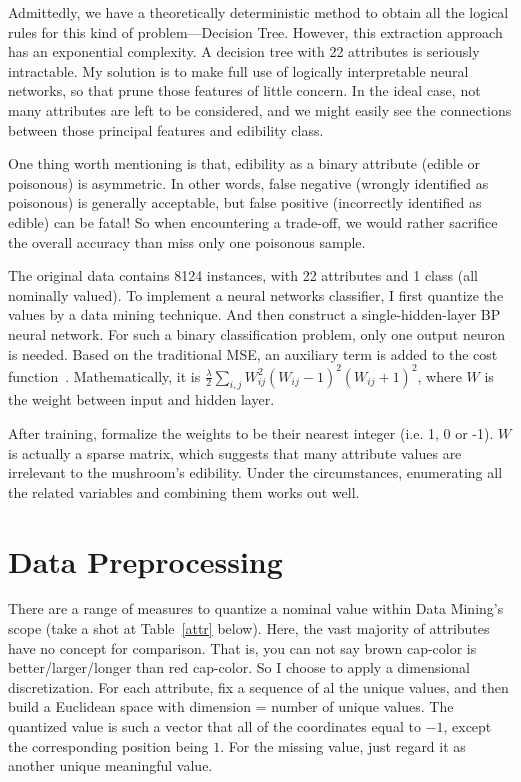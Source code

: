 \documentclass[runningheads]{llncs}
\newcommand*{\term}{\frac{\lambda}{2}\sum_{i, j}W_{ij}^2(W_{ij}-1)^2(W_{ij}+1)^2}
\begin{document}
Admittedly, we have a theoretically deterministic method to obtain all the logical rules for this kind of problem---Decision Tree. However, this extraction approach has an exponential complexity. A decision tree with 22 attributes is seriously intractable. My solution is to make full use of logically interpretable neural networks, so that prune those features of little concern. In the ideal case, not many attributes are left to be considered, and we might easily see the connections between those principal features and edibility class.

One thing worth mentioning is that, edibility as a binary attribute (edible or poisonous) is asymmetric. In other words, false negative (wrongly identified as poisonous) is generally acceptable, but false positive (incorrectly identified as edible) can be fatal! So when encountering a trade-off, we would rather sacrifice the overall accuracy than miss only one poisonous sample.

The original data contains 8124 instances, with 22 attributes and 1 class (all nominally valued). To implement a neural networks classifier, I first quantize the values by a data mining technique. And then construct a single-hidden-layer BP neural network. For such a binary classification problem, only one output neuron is needed. Based on the traditional MSE, an auxiliary term is added to the cost function~\cite{duch1996extraction}. Mathematically, it is $\term$, where $W$ is the weight between input and hidden layer. 

After training, formalize the weights to be their nearest integer (i.e. 1, 0 or -1). $W$ is actually a sparse matrix, which suggests that many attribute values are irrelevant to the mushroom's edibility. Under the circumstances, enumerating all the related variables and combining them works out well.

\section{Data Preprocessing}
There are a range of measures to quantize a nominal value within Data Mining's scope (take a shot at Table~\ref{attr} below). Here, the vast majority of attributes have no concept for comparison. That is, you can not say brown cap-color is better/larger/longer than red cap-color. So I choose to apply a dimensional discretization. For each attribute, fix a sequence of al the unique values, and then build a Euclidean space with dimension = number of unique values. The quantized value is such a vector that all of the coordinates equal to $-1$, except the corresponding position being $1$. For the missing value, just regard it as another unique meaningful value.
\end{document}
